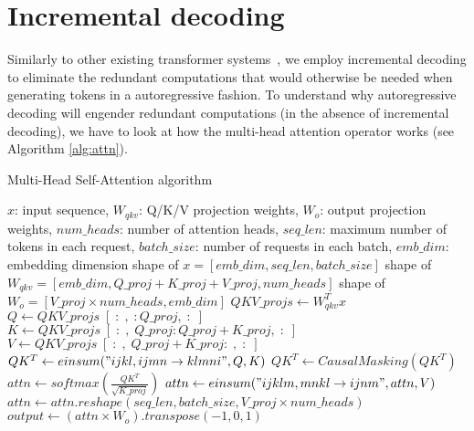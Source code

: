\section{Incremental decoding}\label{incr-decoding-section}
Similarly to other existing transformer systems~\cite{fairseq, orca}, we employ incremental decoding to eliminate the redundant computations that would otherwise be needed when generating tokens in a autoregressive fashion. To understand why autoregressive decoding will engender redundant computations (in the absence of incremental decoding), we have to look at how the multi-head attention operator works (see Algorithm \ref{alg:attn}). 
\begin{algorithm}[H]
  \caption{Multi-Head Self-Attention algorithm}
  \label{alg:attn}
  \small
  \begin{algorithmic}[1]
    \Ensure $x$: input sequence, $W_{qkv}$: Q/K/V projection weights, $W_{o}$: output projection weights, $num\_heads$: number of attention heads,  $seq\_len$: maximum number of tokens in each request, $batch\_size$: number of requests in each batch, $emb\_dim$: embedding dimension
    \Require shape of $x = [emb\_dim, seq\_len, batch\_size]$
    \Require shape of $W_{qkv} = [emb\_dim, Q\_proj + K\_proj + V\_proj, num\_heads]$
    \Require shape of $W_{o} = [V\_proj \times num\_heads, emb\_dim]$
    \State $QKV\_projs \leftarrow W_{qkv}^Tx$
    \State $Q \leftarrow QKV\_projs \; [\; : \;, \; : Q\_proj, \; : \;]$  
    \State $K \leftarrow QKV\_projs \; [\; : \;, \; Q\_proj : Q\_proj + K\_proj, \; : \;]$ 
    \State $V \leftarrow QKV\_projs \; [\; : \;, \; Q\_proj + K\_proj : \;, \; : \;]$ 
    \State $QK^T \leftarrow einsum("ijkl,ijmn\rightarrow klmni",Q,K)$ 
    \State $QK^T \leftarrow CausalMasking(QK^T)$
    \State $attn \leftarrow softmax(\frac{QK^T}{\sqrt{K\_proj}})$
    \State $attn \leftarrow einsum("ijklm,mnkl \rightarrow ijnm", attn, V)$
    \State $attn \leftarrow attn.reshape(seq\_len, batch\_size, V\_proj \times num\_heads)$
    \State $output \leftarrow (attn \times W_{o}).transpose(-1,0,1)$
  \end{algorithmic}
\end{algorithm}
